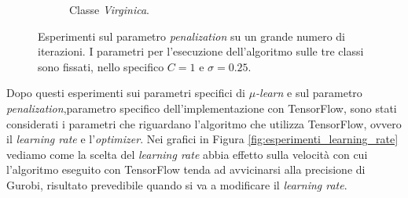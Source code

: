 \documentclass[a4paper,12pt]{report}
\begin{document}
\begin{figure}[H]
\begin{subfigure}{\textwidth}
        \caption{Classe \textit{Virginica}.}
        \label{subfig:Virginica_diffPen_10k}
    \end{subfigure}
    \caption{Esperimenti sul parametro \textit{penalization} su un grande numero di iterazioni. I parametri per l'esecuzione dell'algoritmo sulle tre classi sono fissati, nello specifico $C=1$ e $\sigma=0.25$.}
    \label{fig:esperimenti_penalization_10k}
\end{figure}

\noindent Dopo questi esperimenti sui parametri specifici di \textit{$\mu$-learn} e sul parametro \textit{penalization},parametro specifico dell'implementazione con TensorFlow, sono stati considerati i parametri che riguardano l'algoritmo che utilizza TensorFlow, ovvero il \textit{learning rate} e l'\textit{optimizer}. Nei grafici in Figura \ref{fig:esperimenti_learning_rate} vediamo come la scelta del \textit{learning rate} abbia effetto sulla velocità con cui l'algoritmo eseguito con TensorFlow tenda ad avvicinarsi alla precisione di Gurobi, risultato prevedibile quando si va a modificare il \textit{learning rate}.
\end{document}
